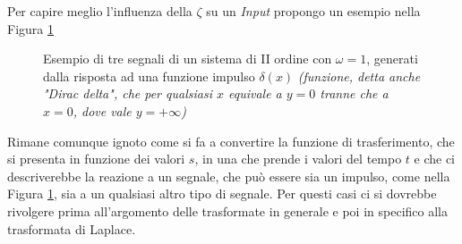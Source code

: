 \documentclass[a4paper, 10pt, final]{article} %
\newcommand{\parenciteit}[2]{\textit{\parencite[#1]{#2}}} %
\begin{document}
    \begin{samepage}
        \noindent Per capire meglio l'influenza della $\zeta$ su un \emph{Input} propongo un esempio nella Figura \ref{fig:ExampleDampingAndFrequencyDifference}
        \begin{figure}[H]
            \centering
            \caption{Esempio di tre segnali di un sistema di II ordine con $\omega=1$, generati dalla risposta ad una funzione impulso $\delta(x)$ \emph{(funzione, detta anche "Dirac delta", che per qualsiasi $x$ equivale a $y = 0$ tranne che a $x = 0$, dove vale $y = +\infty$)} \parenciteit{}{Impulse:Wiki}}
            \label{fig:ExampleDampingAndFrequencyDifference}
        \end{figure}
    \end{samepage}

    Rimane comunque ignoto come si fa a convertire la funzione di trasferimento, che si presenta in funzione dei valori $s$, in una che prende i valori del tempo $t$ e che ci descriverebbe la reazione a un segnale, che pu\`{o} essere sia un impulso, come nella Figura \ref{fig:ExampleDampingAndFrequencyDifference}, sia a un qualsiasi altro tipo di segnale.
    Per questi casi ci si dovrebbe rivolgere prima all'argomento delle trasformate in generale e poi in specifico alla trasformata di Laplace.
\end{document}
